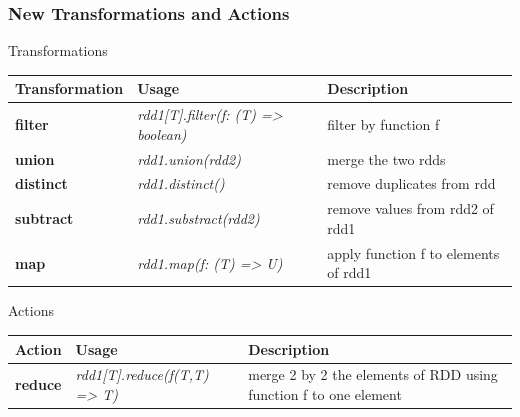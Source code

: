 \documentclass[slidetop,9pt,utf8]{beamer}
\begin{document}
\begin{frame}

  \frametitle{New Transformations and Actions}

  \begin{block}{Transformations}
    \begin{center}
      \begin{tabular}{|m{2.1cm}|m{3.5cm}|m{5cm}|}
        \hline 
        \rowcolor{gray} \textbf{Transformation} & \textbf{Usage} & \textbf{Description} \\ \hline
        \textbf{filter} & \textit{rdd1[T]\newline.filter(f: (T) =\textgreater\xspace boolean)} & filter by function f \\ \hline
        \textbf{union} & \textit{rdd1.union(rdd2)} & merge the two rdds \\ \hline
        \textbf{distinct} & \textit{rdd1.distinct()} & remove duplicates from rdd \\ \hline
        \textbf{subtract} & \textit{rdd1.substract(rdd2)} & remove values from rdd2 of rdd1 \\ \hline
        \textbf{map} & \textit{rdd1.map(f: (T) =\textgreater\xspace U)} & apply function f to elements of rdd1 \\ \hline
      \end{tabular}
    \end{center}
  \end{block}

  \begin{block}{Actions}
    \begin{center}
      \begin{tabular}{|m{2.1cm}|m{3.5cm}|m{5cm}|}
        \hline 
        \rowcolor{gray} \textbf{Action} & \textbf{Usage} & \textbf{Description} \\ \hline
        \textbf{reduce} & \textit{rdd1[T].reduce(f(T,T) =\textgreater\xspace T)} & merge 2 by 2 the elements of RDD using function f to one element \\ \hline
      \end{tabular}
    \end{center}
  \end{block}

\end{frame}
\end{document}
